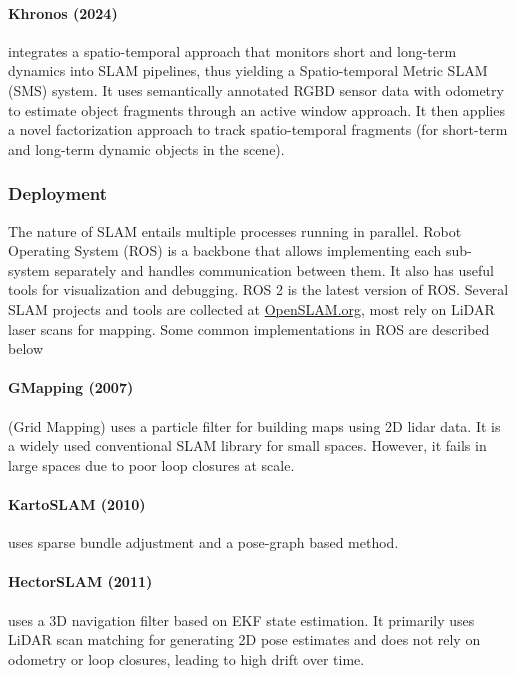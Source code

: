 \paragraph{Khronos (2024) \cite{Schmid2024KhronosAU}} integrates a
spatio-temporal approach that monitors short and long-term dynamics
into SLAM pipelines, thus yielding a Spatio-temporal Metric SLAM (SMS)
system. It uses semantically annotated RGBD sensor data with odometry
to estimate object fragments through an active window approach. It
then applies a novel factorization approach to track spatio-temporal
fragments (for short-term and long-term dynamic objects in the scene).

\subsubsection{Deployment}

The nature of SLAM entails multiple processes running in parallel.
Robot Operating System (ROS) \cite{Quigley2009ROSAO} is a backbone
that allows implementing each sub-system separately and handles
communication between them. It also has useful tools for visualization
and debugging. ROS 2 \cite{Macenski2022RobotOS} is the latest version
of ROS. Several SLAM projects and tools are collected at
\href{https://openslam-org.github.io/}{OpenSLAM.org}, most rely on
LiDAR laser scans for mapping. Some common implementations in ROS are
described below

\paragraph{GMapping (2007) \cite{Grisetti2007ImprovedTF}} (Grid
Mapping) uses a particle filter for building maps using 2D lidar data.
It is a widely used conventional SLAM library for small spaces.
However, it fails in large spaces due to poor loop closures at scale.

\paragraph{KartoSLAM (2010) \cite{Konolige2010EfficientSP}} uses
sparse bundle adjustment and a pose-graph based method.

\paragraph{HectorSLAM (2011) \cite{Kohlbrecher2011AFA}} uses a 3D
navigation filter based on EKF state estimation. It primarily uses
LiDAR scan matching for generating 2D pose estimates and does not
rely on odometry or loop closures, leading to high drift over time.


